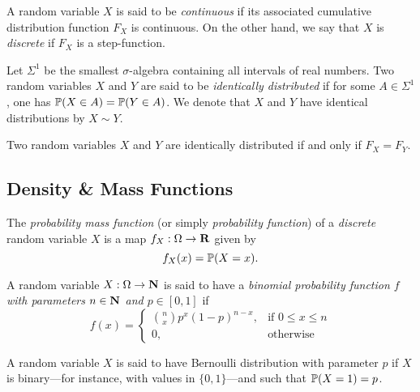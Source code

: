 \begin{definition}
\label{def:continuity-discreteness-random-variable}
A random variable \(X\) is said to be \emph{continuous} if its associated
cumulative distribution function \(F_X\) is continuous. On the other hand, we
say that \(X\) is \emph{discrete} if \(F_X\) is a step-function.
\end{definition}

\begin{definition}
\label{def:identically-distributed-random-variables}
Let \(\Sigma^1\) be the smallest \(\sigma\)-algebra containing all intervals of
real numbers. Two random variables \(X\) and \(Y\) are said to be
\emph{identically distributed} if for some \(A \in \Sigma^1\), one has
\(\operatorname{\mathbb{P}}(X \in A) = \operatorname{\mathbb{P}}(Y \in A)\). We denote that \(X\) and \(Y\) have
identical distributions by \(X \sim Y\).
\end{definition}

\begin{theorem}
\label{thm:random-variables-identical-iff-equal-cdfs}
Two random variables \(X\) and \(Y\) are identically distributed if and only if
\(F_X = F_Y\).
\end{theorem}

\subsection{Density \& Mass Functions}

\begin{definition}
\label{def:probability-mass-function}
The \emph{probability mass function} (or simply \emph{probability function})
of a \emph{discrete} random variable \(X\) is a map \(f_X: \Omega \to \mathbf{R}\) given
by
\[
f_X(x) = \operatorname{\mathbb{P}}(X = x).
\]
\end{definition}

\begin{definition}
\label{def:binomial-distribution}
A random variable \(X: \Omega \to \mathbf{N}\) is said to have a
\emph{binomial probability function \(f\) with parameters \(n \in \mathbf{N}\) and
  \(p \in [0, 1]\)} if
\[
f(x) =
\begin{cases}
  \binom{n}{x} p^x (1 - p)^{n - x}, &\text{if } 0 \leq x \leq n \\
  0, &\text{otherwise}
\end{cases}
\]
\end{definition}

\begin{definition}
\label{def:bernoulli-random-variable}
A random variable \(X\) is said to have Bernoulli distribution with parameter
\(p\) if \(X\) is binary---for instance, with values in \(\{0, 1\}\)---and such
that \(\operatorname{\mathbb{P}}(X = 1) = p\).
\end{definition}

